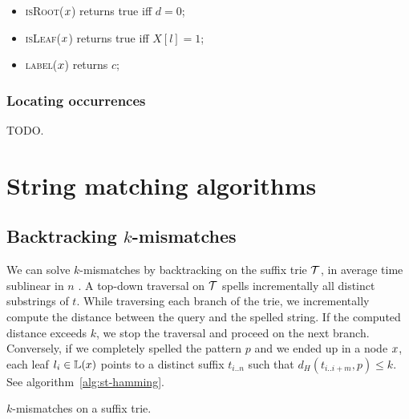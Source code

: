 \begin{itemize}
\item \textsc{isRoot}($x$) returns true iff $d = 0$;
\item \textsc{isLeaf}($x$) returns true iff $X[l] = 1$;
\item \textsc{label}($x$) returns $c$;
\end{itemize}

\subsubsection{Locating occurrences}

TODO.

\section{String matching algorithms}

\subsection{Backtracking $k$-mismatches}

We can solve $k$-mismatches by backtracking \citep{Ukkonen1993, Baeza1999} on the suffix trie $\mathcal {T}$, in average time sublinear in $n$ \citep{Navarro2000}.
A top-down traversal on $\mathcal {T}$ spells incrementally all distinct substrings of $t$.
While traversing each branch of the trie, we incrementally compute the distance between the query and the spelled string.
If the computed distance exceeds $k$, we stop the traversal and proceed on the next branch.
Conversely, if we completely spelled the pattern $p$ and we ended up in a node $x$, each leaf $l_i \in \mathbb {L}(x)$ points to a distinct suffix $t_{i..n}$ such that $d_H(t_{i..i+m}, p) \leq k$.
See algorithm~\ref{alg:st-hamming}.

\begin{algorithm}[h]
\caption{$k$-mismatches on a suffix trie.}
\label{alg:st-hamming}
\begin{algorithmic}[1]
			\State \Report {}
			\Repeat
				\State {}
				\State {}
				\State {}
			\Until {}
		\EndIf
	\EndIf
\EndProcedure
\end{algorithmic}
\end{algorithm}

